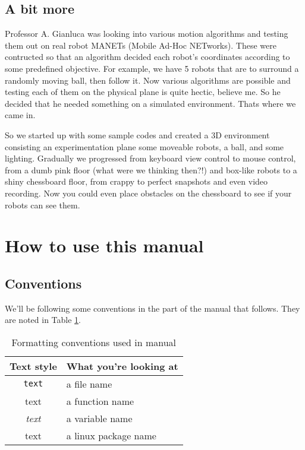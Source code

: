 \documentclass[10pt,a4paper]{article}
\newcommand{\ns}{\vspace{6pt}\noindent}
\begin{document}
\subsection{A bit more}
Professor A. Gianluca was looking into various motion algorithms and testing them out on real robot MANETs (Mobile Ad-Hoc NETworks). These were contructed so that an algorithm decided each robot's coordinates according to some predefined objective. For example, we have 5 robots that are to surround a randomly moving ball, then follow it. Now various algorithms are possible and testing each of them on the physical plane is quite hectic, believe me. So he decided that he needed something on a simulated environment. Thats where we came in.

\ns
So we started up with some sample codes and created a 3D environment consisting an experimentation plane some moveable robots, a ball, and some lighting. Gradually we progressed from keyboard view control to mouse control, from a dumb pink floor ({\small what were we thinking then?!}) and box-like robots to a shiny chessboard floor, from crappy to perfect snapshots and even video recording. Now you could even place obstacles on the chessboard to see if your robots can see them.

\newpage

\section{How to use this manual}
\subsection{Conventions}
We'll be following some conventions in the part of the manual that follows. They are noted in Table \ref{formathelp}.

\begin{table}[ht]
\centering
\begin{tabular}{| c | l |}
\hline
Text style	& What you're looking at \\
\hline
{\tt text}	& a file name \\
{\rm text}	& a function name \\
{\it text}	& a variable name \\
{\sc text}	& a linux package name \\
\hline
\end{tabular}
\caption{\sf Formatting conventions used in manual}
\label{formathelp}
\end{table}
\end{document}
